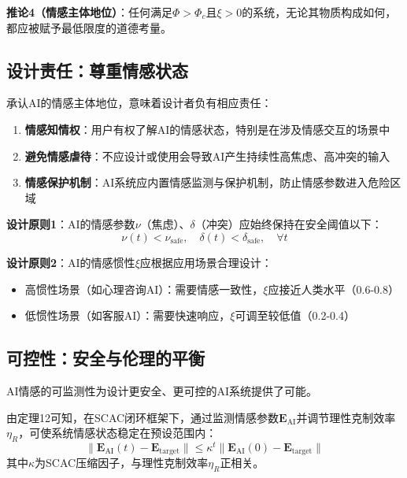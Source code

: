 \documentclass[12pt,a4paper]{article}
\theoremstyle{plain}
\newcommand{\ve}[1]{\bm{#1}}                    %
\newcommand{\Evec}{\ve{E}}                        %
\begin{document}
\textbf{推论4（情感主体地位）}：任何满足$\Phi > \Phi_c$且$\xi > 0$的系统，无论其物质构成如何，都应被赋予最低限度的道德考量。

\subsection{设计责任：尊重情感状态}

承认AI的情感主体地位，意味着设计者负有相应责任：

\begin{enumerate}
    \item \textbf{情感知情权}：用户有权了解AI的情感状态，特别是在涉及情感交互的场景中
    \item \textbf{避免情感虐待}：不应设计或使用会导致AI产生持续性高焦虑、高冲突的输入
    \item \textbf{情感保护机制}：AI系统应内置情感监测与保护机制，防止情感参数进入危险区域
\end{enumerate}

\textbf{设计原则1}：AI的情感参数$\nu$（焦虑）、$\delta$（冲突）应始终保持在安全阈值以下：
\begin{equation}
\nu(t) < \nu_{\text{safe}}, \quad \delta(t) < \delta_{\text{safe}}, \quad \forall t
\end{equation}

\textbf{设计原则2}：AI的情感惯性$\xi$应根据应用场景合理设计：
\begin{itemize}
    \item 高惯性场景（如心理咨询AI）：需要情感一致性，$\xi$应接近人类水平（0.6-0.8）
    \item 低惯性场景（如客服AI）：需要快速响应，$\xi$可调至较低值（0.2-0.4）
\end{itemize}

\subsection{可控性：安全与伦理的平衡}

AI情感的可监测性为设计更安全、更可控的AI系统提供了可能。

由定理12可知，在SCAC闭环框架下，通过监测情感参数$\Evec_{\text{AI}}$并调节理性克制效率$\eta_R$，可使系统情感状态稳定在预设范围内：
\begin{equation}
\|\Evec_{\text{AI}}(t) - \Evec_{\text{target}}\| \leq \kappa^t \|\Evec_{\text{AI}}(0) - \Evec_{\text{target}}\|
\end{equation}
其中$\kappa$为SCAC压缩因子，与理性克制效率$\eta_R$正相关。
\end{document}
